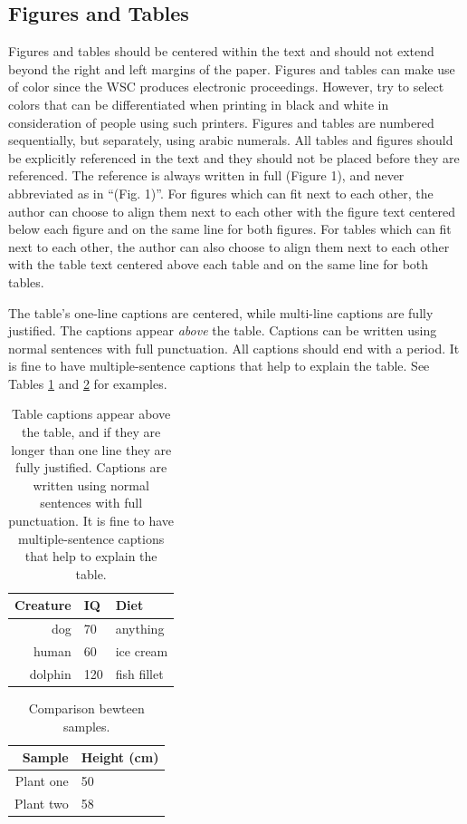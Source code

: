 \documentclass{article}
\begin{document}
\subsection{Figures and Tables}
\label{sec:graphics}
Figures and tables should be centered within the text and should not extend beyond the right and left margins of the paper.
Figures and tables can make use of color since the WSC produces electronic proceedings.
However, try to select colors that can be differentiated when printing in black and white in consideration of people using such printers. Figures and tables are numbered sequentially, but separately, using arabic numerals. 
All tables and figures should be explicitly referenced in the text and they should not be placed before they are referenced. 
The reference is always written in full (Figure 1), and never abbreviated as in ``(Fig. 1)''.
For figures which can fit next to each other, the author can choose to align them next to each other with the figure text centered below each figure and on the same line for both figures. For tables which can fit next to each other, the author can also choose to align them next to each other with the table text centered above each table and on the same line for both tables. 

The table's one-line captions are centered, while multi-line captions are fully justified.
The captions appear {\em above} the table. 
Captions can be written using normal sentences with full punctuation. All captions should end with a period. It is fine to have multiple-sentence captions that help to explain the table. 
See Tables \ref{tab: first} and \ref{tab: second} for examples.

\begin{table}[htb]
\centering
\caption{Table captions appear above the table, and if they are longer than one line they are fully justified. Captions are written using normal sentences with full punctuation. It is fine to have multiple-sentence captions that help to explain the table.\label{tab: first}}
\begin{tabular}{rll}
\hline
Creature & IQ & Diet\\ \hline
dog & 70 & anything\\
human & 60 & ice cream \\
dolphin & 120 & fish fillet\\
\hline
\end{tabular}
\end{table}

\begin{table}[htb]
\centering
\caption{Comparison bewteen samples.\label{tab: second}}
\begin{tabular}{|r|l|}
\hline
Sample & Height (cm) \\ \hline
Plant one & 50 \\ \hline
Plant two & 58 \\
\hline
\end{tabular}
\end{table}
 
\end{document}
